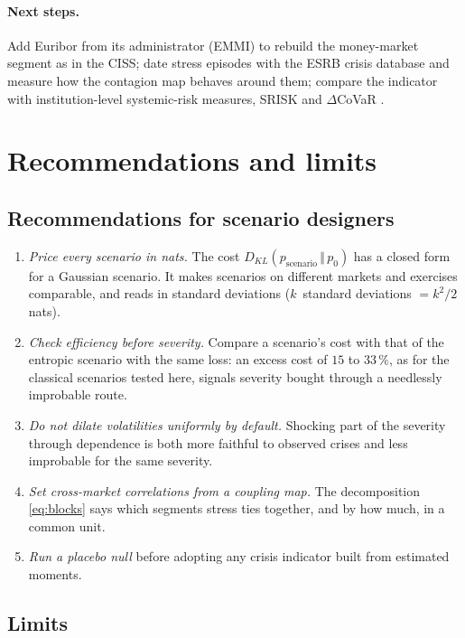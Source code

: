 \documentclass[11pt]{article}
\theoremstyle{definition}
\newcommand{\KL}[2]{D_{KL}\!\left(#1\,\Vert\,#2\right)}
\begin{document}
\paragraph{Next steps.} Add Euribor from its administrator (EMMI) to rebuild
the money-market segment as in the CISS; date stress episodes with the ESRB
crisis database \citep{loduca2017} and measure how the contagion map behaves
around them; compare the indicator with institution-level systemic-risk
measures, SRISK \citep{brownlees2017} and $\Delta$CoVaR \citep{adrian2016}.

\section{Recommendations and limits}
\label{sec:reco}

\subsection{Recommendations for scenario designers}

\begin{enumerate}
\item \emph{Price every scenario in nats.} The cost
$\KL{p_{\text{scenario}}}{p_0}$ has a closed form for a Gaussian scenario. It
makes scenarios on different markets and exercises comparable, and reads in
standard deviations ($k$~standard deviations $=k^2/2$ nats).
\item \emph{Check efficiency before severity.} Compare a scenario's cost with
that of the entropic scenario with the same loss: an excess cost of $15$ to
$33\,\%$, as for the classical scenarios tested here, signals severity bought
through a needlessly improbable route.
\item \emph{Do not dilate volatilities uniformly by default.} Shocking part of
the severity through dependence is both more faithful to observed crises and
less improbable for the same severity.
\item \emph{Set cross-market correlations from a coupling map.} The
decomposition \eqref{eq:blocks} says which segments stress ties together, and
by how much, in a common unit.
\item \emph{Run a placebo null} before adopting any crisis indicator built
from estimated moments.
\end{enumerate}

\subsection{Limits}
\end{document}
